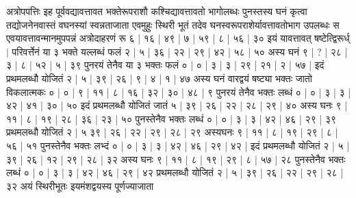 \documentclass[12pt]{article}
\begin{document}
{अत्रोपपत्तिः
इह पूर्ववद्यावत्तावत भक्तेरूपराशौ कश्चिद्यावत्तावतो भागोलब्धः पुनस्तस्य घनं कृत्वा
तद्योजनेनवास्तं वघनस्यां स्वन्नताजाता एवमुहुः स्थिरी भूतं तदेव घनस्वरूपराशेर्यावत्तावतोभाग उपलब्धः स एवयावत्तावन्मा\-नमुपपन्नं
अत्रोदाहरणं रू ६ | १६ | ४९ | ७ | ५९ | ८ | ५६ | ३० इयं यावत्तावत् षष्टेत्द्विरूर्ध्$|$
परिवर्त्तेनं या ३ भक्ते यल्लब्धं फलं २ | ५ | ३६ | २२ | २९ | ४२ | ५८ | ५० अस्य घनं ९ | ? | २८ | ३ | ८ | ५२ | ५ | ३९
पुनरयं तेनैव या ३ भक्तः फलं ० | ० | ३ | ३ | २९ | २१ | २ | ५७ |
इदं प्रथमलब्धौ योजितं २ | ५ | ३९ | २६ | ९ | ४ | १ | ४७ अस्य घनं वारद्वयं षष्ट्या भक्तः जातो विकलात्मकः ० | ० | ९ | ११ | ८ | १६ | ३२ | ३० | ४८ | ९ पुनरयं तेनैव भक्तः लब्धं ० | ० | ३ | ३ | ४२ | ४१ | ३० | ५०
इदं प्रथमलब्धौ योजितं जातं ५ | ३९ | २६ | २२ | २८ | २९ | ४० अस्य घनः ९ | ११ | ८ | १९ | २८ | ३६ | २३ | ५० पुनस्तेनैव भक्तः लब्धं ० | ० | ३ | ३ | ४२ | ४६ | २९ | ३९ प्रथमलब्धौ योजितं २ | ५ ३९ | २६ | २२ | २९ | २८ | २९
अस्यघनः ९ | ११ | ८ | १९ | २९ | ८ | ५६ | ५१ पुनस्तेनैव भक्तः लभ्दं ० | ० | ३ | ३ | ४२ | ४६ | २९ | ४२ | इदं प्रथमलब्धौ योजितं २ | ५ | ३९ | २६ | १२ | २९ | २८ | ३२ अस्य घनः ९ | ११ | ८ | १९ | २९ | ८ | ५७ | २८
पुनस्तेनैव भक्तः लब्धं ० | ० | ३ | ३ | ४२ | ४६ | २९ | ४२ प्रथमलब्धौ योजितं २ | ५ | ३९ | २६ | २२ | २९ | २८ | ३२ अयं स्थिरीभूतः इयमंशद्वयस्य पूर्णज्याजाता

}
\end{document}

